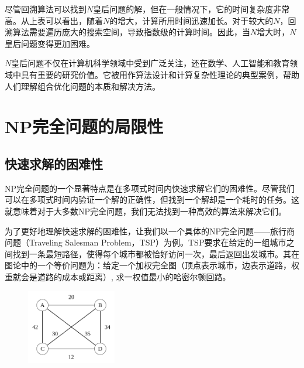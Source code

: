 \documentclass[UTF8,openany,zihao=5]{ctexbook}
\begin{document}
尽管回溯算法可以找到$N$皇后问题的解，但在一般情况下，它的时间复杂度非常高。从上表可以看出，随着$N$的增大，计算所用时间迅速加长。对于较大的$N$，回溯算法需要遍历庞大的搜索空间，导致指数级的计算时间。因此，当$N$增大时，$N$皇后问题变得更加困难。

$N$皇后问题不仅在计算机科学领域中受到广泛关注，还在数学、人工智能和教育领域中具有重要的研究价值。它被用作算法设计和计算复杂性理论的典型案例，帮助人们理解组合优化问题的本质和解决方法\cite{bi:XZL}。







\chapter{NP完全问题的局限性}

\section{快速求解的困难性}

NP完全问题的一个显著特点是在多项式时间内快速求解它们的困难性。尽管我们可以在多项式时间内验证一个解的正确性，但找到一个解却是一个耗时的任务。这就意味着对于大多数NP完全问题，我们无法找到一种高效的算法来解决它们。

为了更好地理解快速求解的困难性，让我们以一个具体的NP完全问题——旅行商问题（Traveling Salesman Problem，TSP）为例。TSP要求在给定的一组城市之间找到一条最短路径，使得每个城市都被恰好访问一次，最后返回出发城市。其在图论中的一个等价问题为：给定一个加权完全图（顶点表示城市，边表示道路，权重就会是道路的成本或距离）, 求一权值最小的哈密尔顿回路。

\vspace{10pt}
\begin{figure}[H]
  \begin{center}
    \includegraphics[width=0.35\textwidth]{images/Weighted_K4.svg.png}
    \centering
  \end{center}
\end{figure}
\end{document}
